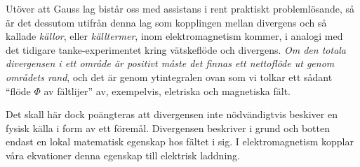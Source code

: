 Ut{\"o}ver att Gauss lag bist{\aa}r oss med assistans i rent praktiskt
probleml{\"o}sande, s{\aa} {\"a}r det dessutom utifr{\aa}n denna lag som
kopplingen mellan divergens och s{\aa} kallade {\it k{\"a}llor}, eller
{\it k{\"a}lltermer}, inom elektromagnetism kommer, i analogi med det tidigare
tanke-experimentet kring v{\"a}tskefl{\"o}de och divergens.
{\it Om den totala divergensen i ett omr{\aa}de {\"a}r positivt m{\aa}ste det
finnas ett nettofl{\"o}de ut genom omr{\aa}dets rand}, och det {\"a}r genom
ytintegralen ovan som vi tolkar ett s{\aa}dant ``fl{\"o}de $\Phi$ av
f{\"a}ltlijer'' av, exempelvis, eletriska och magnetiska f{\"a}lt.

Det skall h{\"a}r dock po{\"a}ngteras att divergensen inte
n{\"o}dv{\"a}ndigtvis beskiver en fysisk k{\"a}lla i form av ett
f{\"o}rem{\aa}l. Divergensen beskriver i grund och botten endast en lokal
matematisk egenskap hos f{\"a}ltet i sig. I elektromagnetism kopplar
v{\aa}ra ekvationer denna egenskap till elektrisk laddning.

